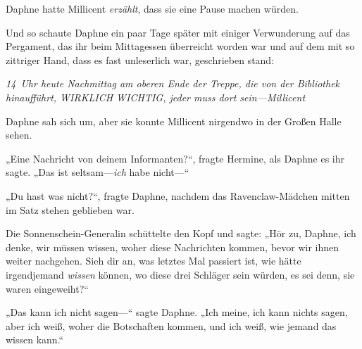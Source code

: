 Daphne hatte Millicent \emph{erzählt}, dass sie eine Pause machen würden.

Und so schaute Daphne ein paar Tage später mit einiger Verwunderung auf das Pergament, das ihr beim Mittagessen überreicht worden war und auf dem mit so zittriger Hand, dass es fast unleserlich war, geschrieben stand:

\emph{14~Uhr heute Nachmittag am oberen Ende der Treppe, die von der Bibliothek hinaufführt, WIRKLICH WICHTIG, jeder muss dort sein—Millicent}

Daphne sah sich um, aber sie konnte Millicent nirgendwo in der Großen Halle sehen.

„Eine Nachricht von deinem Informanten?“, fragte Hermine, als Daphne es ihr sagte. „Das ist seltsam—\emph{ich} habe nicht—“

„Du hast was nicht?“, fragte Daphne, nachdem das Ravenclaw-Mädchen mitten im Satz stehen geblieben war.

Die Sonnenschein-Generalin schüttelte den Kopf und sagte: „Hör zu, Daphne, ich denke, wir müssen wissen, woher diese Nachrichten kommen, bevor wir ihnen weiter nachgehen. Sieh dir an, was letztes Mal passiert ist, wie hätte irgendjemand \emph{wissen} können, wo diese drei Schläger sein würden, es sei denn, sie waren eingeweiht?“

„Das kann ich nicht sagen—“ sagte Daphne. „Ich meine, ich kann nichts sagen, aber ich weiß, woher die Botschaften kommen, und ich weiß, wie jemand das wissen kann.“

